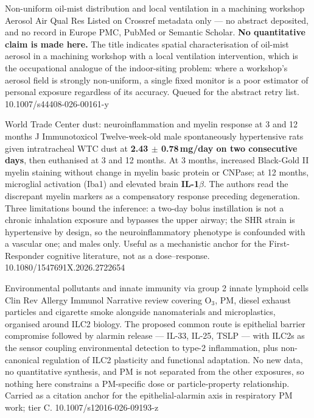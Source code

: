 \documentclass[10pt]{article}
\begin{document}
{Non-uniform oil-mist distribution and local ventilation in a machining workshop}
{Aerosol Air Qual Res}
{Listed on Crossref metadata only --- no abstract deposited, and no record in Europe PMC,
PubMed or Semantic Scholar. \textbf{No quantitative claim is made here.} The title indicates
spatial characterisation of oil-mist aerosol in a machining workshop with a local
ventilation intervention, which is the occupational analogue of the indoor-siting problem:
where a workshop's aerosol field is strongly non-uniform, a single fixed monitor is a poor
estimator of personal exposure regardless of its accuracy. Queued for the abstract retry
list.}
{10.1007/s44408-026-00161-y}


{World Trade Center dust: neuroinflammation and myelin response at 3 and 12 months}
{J Immunotoxicol}
{Twelve-week-old male spontaneously hypertensive rats given intratracheal WTC dust at
\textbf{2.43 $\pm$ 0.78\,mg/day on two consecutive days}, then euthanised at 3 and 12 months.
At 3 months, increased Black-Gold II myelin staining without change in myelin basic protein
or CNPase; at 12 months, microglial activation (Iba1) and elevated brain
\textbf{IL-1$\beta$}. The authors read the discrepant myelin markers as a compensatory
response preceding degeneration. Three limitations bound the inference: a two-day bolus
instillation is not a chronic inhalation exposure and bypasses the upper airway; the SHR
strain is hypertensive by design, so the neuroinflammatory phenotype is confounded with a
vascular one; and males only. Useful as a mechanistic anchor for the First-Responder
cognitive literature, not as a dose--response.}
{10.1080/1547691X.2026.2722654}

{Environmental pollutants and innate immunity via group 2 innate lymphoid cells}
{Clin Rev Allergy Immunol}
{Narrative review covering O$_3$, PM, diesel exhaust particles and cigarette smoke alongside
nanomaterials and microplastics, organised around ILC2 biology. The proposed common route is
epithelial barrier compromise followed by alarmin release --- IL-33, IL-25, TSLP --- with
ILC2s as the sensor coupling environmental detection to type-2 inflammation, plus
non-canonical regulation of ILC2 plasticity and functional adaptation. No new data, no
quantitative synthesis, and PM is not separated from the other exposures, so nothing here
constrains a PM-specific dose or particle-property relationship. Carried as a citation
anchor for the epithelial-alarmin axis in respiratory PM work; tier C.}
{10.1007/s12016-026-09193-z}
\end{document}

